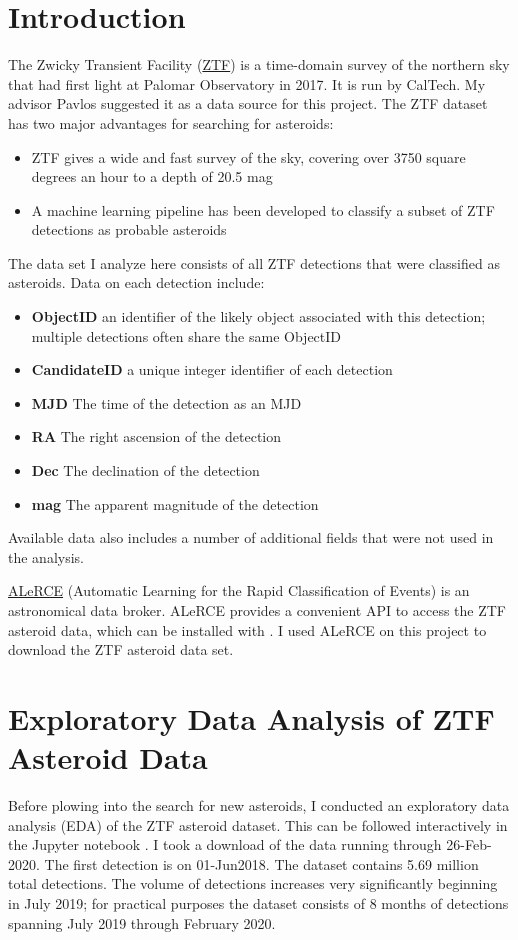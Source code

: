 \section{Introduction}
\label{section_ztf_intro}
The Zwicky Transient Facility (\href{https://www.ztf.caltech.edu/}{ZTF}) is a time-domain survey of the northern sky
that had first light at Palomar Observatory in 2017.  It is run by CalTech.
My advisor Pavlos suggested it as a data source for this project.
The ZTF dataset has two major advantages for searching for asteroids:
\begin{itemize}
\item ZTF gives a wide and fast survey of the sky, covering over 3750 square degrees an hour to a depth of 20.5 mag
\item A machine learning pipeline has been developed to classify a subset of ZTF detections as probable asteroids
\end{itemize}
The data set I analyze here consists of all ZTF detections that were classified as asteroids.
Data on each detection include:
\begin{itemize}
\item \textbf{ObjectID} an identifier of the likely object associated with this detection; multiple detections often share the same ObjectID
\item \textbf{CandidateID} a unique integer identifier of each detection
\item \textbf{MJD} The time of the detection as an MJD
\item \textbf{RA} The right ascension of the detection
\item \textbf{Dec} The declination of the detection
\item \textbf{mag} The apparent magnitude of the detection
\end{itemize}
Available data also includes a number of additional fields that were not used in the analysis.

\href{https://github.com/alercebroker}{ALeRCE} (Automatic Learning for the Rapid Classification of Events) is an astronomical data broker.
ALeRCE provides a convenient API to access the ZTF asteroid data, which can be installed with .
I used ALeRCE on this project to download the ZTF asteroid data set.

\section{Exploratory Data Analysis of ZTF Asteroid Data}
\label{section_ztf_eda}
Before plowing into the search for new asteroids, I conducted an exploratory data analysis (EDA) of the ZTF asteroid dataset.
This can be followed interactively in the Jupyter notebook .
I took a download of the data running through 26-Feb-2020.
The first detection is on 01-Jun2018.
The dataset contains 5.69 million total detections.  
The volume of detections increases very significantly beginning in July 2019; 
for practical purposes the dataset consists of 8 months of detections spanning July 2019 through February 2020.

